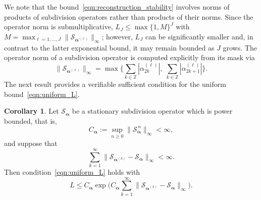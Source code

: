 \documentclass[11pt,a4paper]{article}
\theoremstyle{definition}
\newtheorem{corollary}[theorem]{Corollary}
\begin{document}
We note that the bound~\eqref{eqn:reconstruction_stability} involves norms of products of subdivision operators rather than products of their norms. Since the operator norm is submultiplicative, $L_J\leq\max\{1,M\}^J$ with $M=\max_{\ell=1,\dots,J}\|\mathcal{S}_{\boldsymbol{\alpha}^{(\ell)}}\|_\infty$; however, $L_J$ can be significantly smaller and, in contrast to the latter exponential bound, it may remain bounded as $J$ grows. The operator norm of a subdivision operator is computed explicitly from its mask via
\begin{equation}\label{eqn:subdivision_operator_norm}
    \|\mathcal{S}_{\boldsymbol{\alpha}^{(\ell)}}\|_\infty=\max\bigg\{\sum_{k\in\mathbb{Z}}|\alpha^{(\ell)}_{2k}|,\; \sum_{k\in\mathbb{Z}}|\alpha^{(\ell)}_{2k+1}|\bigg\}.
\end{equation}
The next result provides a verifiable sufficient condition for the uniform bound~\eqref{eqn:uniform_L}.

\begin{corollary} \label{cor:uniform_stability}
Let $\mathcal{S}_{\boldsymbol{\alpha}}$ be a stationary subdivision operator which is power bounded, that is,
\begin{equation*}
    C_{\boldsymbol{\alpha}}:=\sup_{n\geq0}\|\mathcal{S}_{\boldsymbol{\alpha}}^{\,n}\|_\infty<\infty,
\end{equation*}
and suppose that
\begin{equation}\label{eqn:summable_perturbations}
    \sum_{k=1}^{\infty}\big\|\mathcal{S}_{\boldsymbol{\alpha}^{(k)}}-\mathcal{S}_{\boldsymbol{\alpha}}\big\|_\infty<\infty.
\end{equation}
Then condition~\eqref{eqn:uniform_L} holds with
\begin{equation*}
    L\leq C_{\boldsymbol{\alpha}}\exp\bigg(C_{\boldsymbol{\alpha}}\sum_{k=1}^{\infty}\big\|\mathcal{S}_{\boldsymbol{\alpha}^{(k)}}-\mathcal{S}_{\boldsymbol{\alpha}}\big\|_\infty\bigg).
\end{equation*}
\end{corollary}
\end{document}
